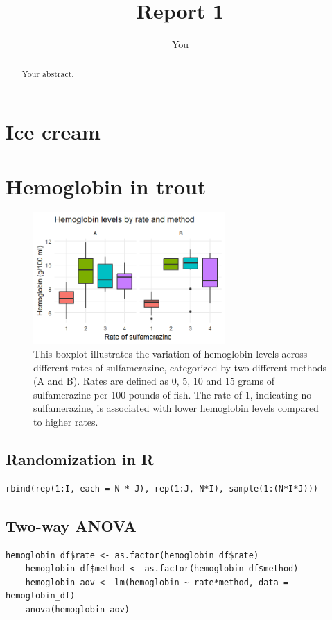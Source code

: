 \documentclass{article}
\title{Report 1}
\author{You}
\begin{document}
\maketitle

\begin{abstract}
Your abstract.
\end{abstract}

\section{Ice cream}

\section{Hemoglobin in trout}

\begin{figure}[h]
    \centering
    \includegraphics[height=5cm]{BoxplotHemoglobin.png}
    \caption{This boxplot illustrates the variation of hemoglobin levels across different rates of sulfamerazine, categorized by two different methods (A and B). Rates are defined as 0, 5, 10 and 15 grams of sulfamerazine per 100 pounds of fish. The rate of 1, indicating no sulfamerazine, is associated with lower hemoglobin levels compared to higher rates. }
    \label{fig:boxHem}
\end{figure}

\subsection{Randomization in R}
\begin{lstlisting}[caption="Randomization in R",label={lst:R}]
    rbind(rep(1:I, each = N * J), rep(1:J, N*I), sample(1:(N*I*J)))
\end{lstlisting}

\subsection{Two-way ANOVA}
\begin{lstlisting}[caption="Two-way ANOVA", label={lst:T}]
    hemoglobin_df$rate <- as.factor(hemoglobin_df$rate) 
    hemoglobin_df$method <- as.factor(hemoglobin_df$method)
    hemoglobin_aov <- lm(hemoglobin ~ rate*method, data = hemoglobin_df)
    anova(hemoglobin_aov)   
\end{lstlisting}
\end{document}
